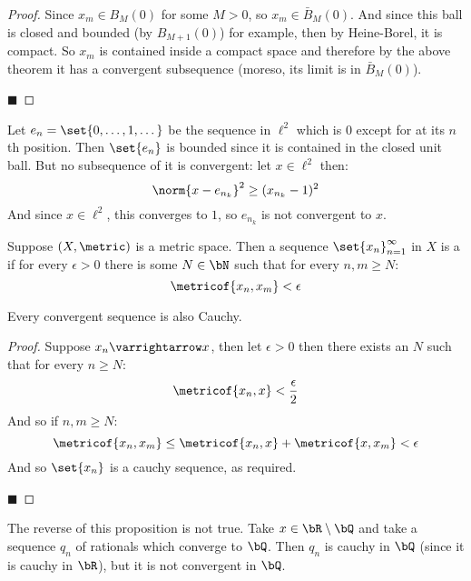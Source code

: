\documentclass[10pt]{article}
\begin{document}
\begin{proof}

    Since $x_m\in B_M(0)$ for some $M>0$, so $x_m\in\bar B_M(0)$.
    And since this ball is closed and bounded (by $B_{M+1}(0)$) for example, then by Heine-Borel, it is compact.
    So $x_m$ is contained inside a compact space and therefore by the above theorem it has a convergent subsequence (moreso, its limit is in $\bar B_M(0)$).

    \hfill$\blacksquare$

\end{proof}

\begin{exam}

    Let $e_n=\set{0,\dots,1,\dots}$ be the sequence in $\ell^2$ which is $0$ except for at its $n$th position.
    Then $\set{e_n}$ is bounded since it is contained in the closed unit ball.
    But no subsequence of it is convergent: let $x\in\ell^2$ then:
    \[ \norm{x-e_{n_k}}^2 \geq (x_{n_k}-1)^2 \]
    And since $x\in\ell^2$, this converges to $1$, so $e_{n_k}$ is not convergent to $x$.

\end{exam}

\begin{defn*}

    Suppose $(X,\metric)$ is a metric space.
    Then a sequence $\set{x_n}_{n=1}^\infty$ in $X$ is a  if for every $\epsilon>0$ there is some $N\in\bN$ such that for every $n,m\geq N$:
        \[ \metricof{x_n, x_m} < \epsilon \]

\end{defn*}

\begin{prop*}

    Every convergent sequence is also Cauchy.

\end{prop*}

\begin{proof}

    Suppose $x_n\varrightarrow x$, then let $\epsilon>0$ then there exists an $N$ such that for every $n\geq N$:
        \[ \metricof{x_n, x} < \frac\epsilon2 \]
    And so if $n,m\geq N$:
        \[ \metricof{x_n, x_m} \leq \metricof{x_n, x} + \metricof{x, x_m} < \epsilon \]
    And so $\set{x_n}$ is a cauchy sequence, as required.

    \hfill$\blacksquare$

\end{proof}

The reverse of this proposition is not true.
Take $x\in\bR\setminus\bQ$ and take a sequence $q_n$ of rationals which converge to $\bQ$.
Then $q_n$ is cauchy in $\bQ$ (since it is cauchy in $\bR$), but it is not convergent in $\bQ$.
\end{document}
